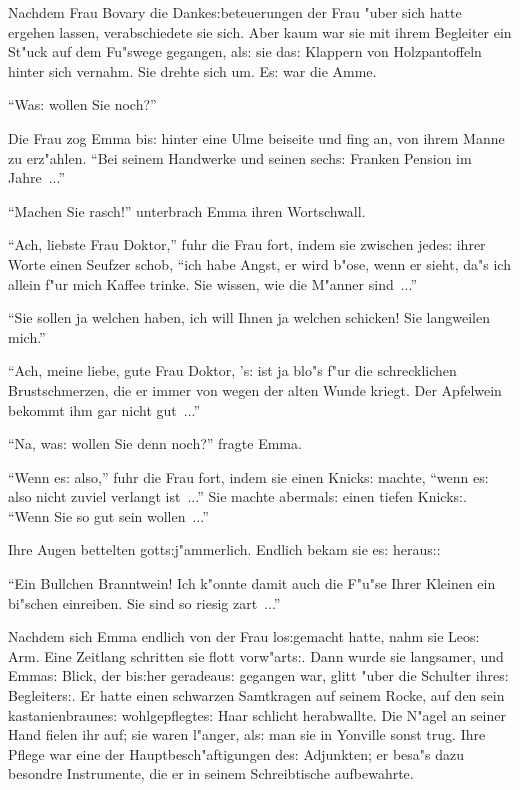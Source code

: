 \documentclass[oneside,12pt]{book}
\newcommand{\s}{s:}%
\begin{document}
Nachdem Frau Bovary die Danke{\s}beteuerungen der Frau "uber sich
hatte ergehen lassen, verabschiedete sie sich. Aber kaum war sie
mit ihrem Begleiter ein St"uck auf dem Fu"swege gegangen, al{\s}
sie da{\s} Klappern von Holzpantoffeln hinter sich vernahm. Sie
drehte sich um. E{\s} war die Amme.

"`Wa{\s} wollen Sie noch?"'

Die Frau zog Emma bi{\s} hinter eine Ulme beiseite und fing an,
von ihrem Manne zu erz"ahlen. "`Bei seinem Handwerke und seinen
sech{\s} Franken Pension im Jahre~..."'

"`Machen Sie rasch!"' unterbrach Emma ihren Wortschwall.

"`Ach, liebste Frau Doktor,"' fuhr die Frau fort, indem sie
zwischen jede{\s} ihrer Worte einen Seufzer schob, "`ich habe
Angst, er wird b"ose, wenn er sieht, da"s ich allein f"ur mich
Kaffee trinke. Sie wissen, wie die M"anner sind~..."'

"`Sie sollen ja welchen haben, ich will Ihnen ja welchen schicken!
Sie langweilen mich."'

"`Ach, meine liebe, gute Frau Doktor, '{\s} ist ja blo"s f"ur die
schrecklichen Brustschmerzen, die er immer von wegen der alten
Wunde kriegt. Der Apfelwein bekommt ihm gar nicht gut~..."'

"`Na, wa{\s} wollen Sie denn noch?"' fragte Emma.

"`Wenn e{\s} also,"' fuhr die Frau fort, indem sie einen Knick{\s}
machte, "`wenn e{\s} also nicht zuviel verlangt ist~..."' Sie
machte abermal{\s} einen tiefen Knick{\s}. "`Wenn Sie so gut sein
wollen~..."'

Ihre Augen bettelten gott{\s}j"ammerlich. Endlich bekam sie e{\s}
herau{\s}:

"`Ein Bullchen Branntwein! Ich k"onnte damit auch die F"u"se Ihrer
Kleinen ein bi"schen einreiben. Sie sind so riesig zart~..."'

Nachdem sich Emma endlich von der Frau lo{\s}gemacht hatte, nahm
sie Leo{\s} Arm. Eine Zeitlang schritten sie flott vorw"art{\s}.
Dann wurde sie langsamer, und Emma{\s} Blick, der bi{\s}her
geradeau{\s} gegangen war, glitt "uber die Schulter ihre{\s}
Begleiter{\s}. Er hatte einen schwarzen Samtkragen auf seinem
Rocke, auf den sein kastanienbraune{\s} wohlgepflegte{\s} Haar
schlicht herabwallte. Die N"agel an seiner Hand fielen ihr auf;
sie waren l"anger, al{\s} man sie in Yonville sonst trug. Ihre
Pflege war eine der Hauptbesch"aftigungen de{\s} Adjunkten; er
besa"s dazu besondre Instrumente, die er in seinem Schreibtische
aufbewahrte.
\end{document}
